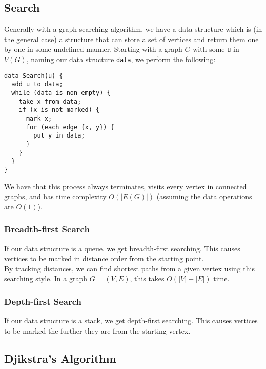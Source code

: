 \vfill

\subsection{Search}

Generally with a graph searching algorithm, we have a data structure 
which is (in the general case) a structure that can store a set of 
vertices and return them one by one in some undefined manner. 
Starting with a graph $G$ with some \texttt{u} in $V(G)$, naming 
our data structure \texttt{data}, we perform the following:
\begin{lstlisting}
data Search(u) {
  add u to data;
  while (data is non-empty) {
    take x from data;
    if (x is not marked) {
      mark x;
      for (each edge {x, y}) {
        put y in data;
      }
    }
  }
}
\end{lstlisting} We have that this process always terminates, visits
every vertex in connected graphs, and has time complexity $O(|E(G)|)$
(assuming the data operations are $O(1)$).

\subsubsection{Breadth-first Search}

If our data structure is a queue, we get breadth-first searching.
This causes vertices to be marked in distance order from the starting
point.
\\[\baselineskip]
By tracking distances, we can find shortest
paths from a given vertex using this searching style. In a graph $G = (V, E)$, 
this takes $O(|V| + |E|)$ time.

\subsubsection{Depth-first Search}

If our data structure is a stack, we get depth-first searching.
This causes vertices to be marked the further they are from
the starting vertex.

\newpage

\subsection{Djikstra's Algorithm}

